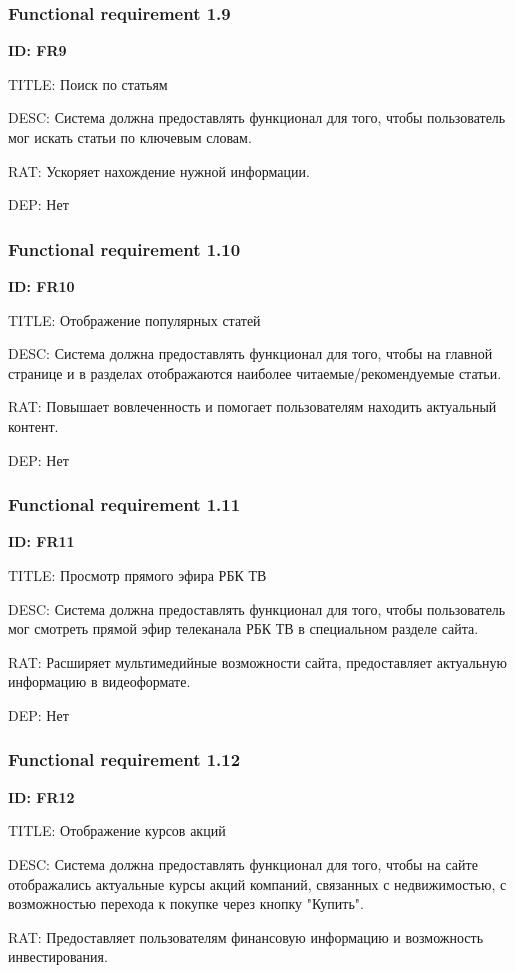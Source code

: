 \documentclass{scrreprt}
\begin{document}
\subsubsection{Functional requirement 1.9}
\textbf{ID: FR9}

TITLE: Поиск по статьям

DESC: Система должна предоставлять функционал для того, чтобы пользователь мог искать статьи по ключевым словам.

RAT: Ускоряет нахождение нужной информации.

DEP: Нет
\subsubsection{Functional requirement 1.10}
\textbf{ID: FR10}

TITLE: Отображение популярных статей

DESC: Система должна предоставлять функционал для того, чтобы на главной странице и в разделах отображаются наиболее читаемые/рекомендуемые статьи.

RAT: Повышает вовлеченность и помогает пользователям находить актуальный контент.

DEP: Нет

\subsubsection{Functional requirement 1.11}
\textbf{ID: FR11}

TITLE: Просмотр прямого эфира РБК ТВ

DESC: Система должна предоставлять функционал для того, чтобы пользователь мог смотреть прямой эфир телеканала РБК ТВ в специальном разделе сайта.

RAT: Расширяет мультимедийные возможности сайта, предоставляет актуальную информацию в видеоформате.

DEP: Нет
\subsubsection{Functional requirement 1.12}
\textbf{ID: FR12}

TITLE: Отображение курсов акций

DESC: Система должна предоставлять функционал для того, чтобы на сайте отображались актуальные курсы акций компаний, связанных с недвижимостью, с возможностью перехода к покупке через кнопку "Купить".

RAT: Предоставляет пользователям финансовую информацию и возможность инвестирования.
\end{document}
